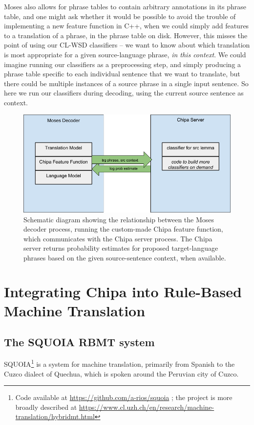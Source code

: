 Moses also allows for phrase tables to contain arbitrary annotations in its
phrase table, and one might ask whether it would be possible to avoid the
trouble of implementing a new feature function in C++, when we could simply
add features to a translation of a phrase, in the phrase table on disk.
However, this misses the point of using our CL-WSD classifiers -- we want to
know about which translation is most appropriate for a given source-language
phrase, \emph{in this context}. We could imagine running our classifiers as a
preprocessing step, and simply producing a phrase table specific to each
individual sentence that we want to translate, but there could be multiple
instances of a source phrase in a single input sentence. So here we run our
classifiers during decoding, using the current source sentence as context.

\begin{figure}
  \begin{centering}
  \includegraphics[width=15cm]{moses-chipa-diagram.png}
  \end{centering}
  \caption{Schematic diagram showing the relationship between the Moses decoder
  process, running the custom-made Chipa feature function, which communicates
  with the Chipa server process. The Chipa server returns probability
  estimates for proposed target-language phrases based on the given
  source-sentence context, when available.}
  \label{fig:moses-chipa-diagram}
\end{figure}

\section{Integrating Chipa into Rule-Based Machine Translation}

\subsection{The SQUOIA RBMT system}
SQUOIA\footnote{Code available at \url{https://github.com/a-rios/squoia} ;
the project is more broadly described at
\url{https://www.cl.uzh.ch/en/research/machine-translation/hybridmt.html}}
is a system for machine translation, primarily from Spanish to the Cuzco
dialect of Quechua, which is spoken around the Peruvian city of Cuzco.

